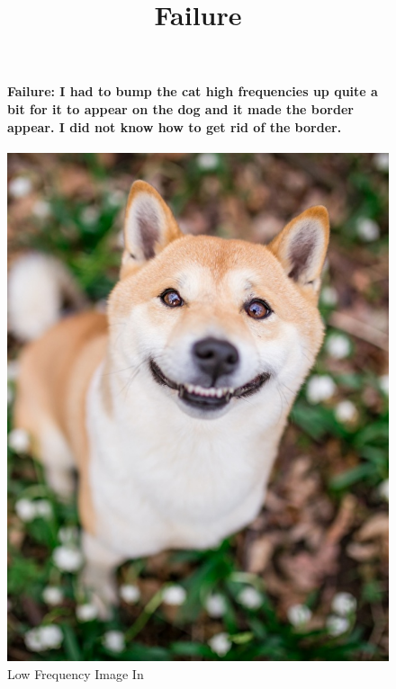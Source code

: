 \documentclass{article}
\begin{document}
\begin{figure}[!htb]
\title{\textbf {Failure}}
\paragraph{Failure: I had to bump the cat high frequencies up quite a bit for it to appear on the dog and it made the border appear. I did not know how to get rid of the border.}
    \includegraphics[width=\linewidth]{dog.jpeg}
    \caption{Low Frequency Image In}\label{fig:awesome_image1}
\endminipage
{}

\end{figure}
\end{document}
